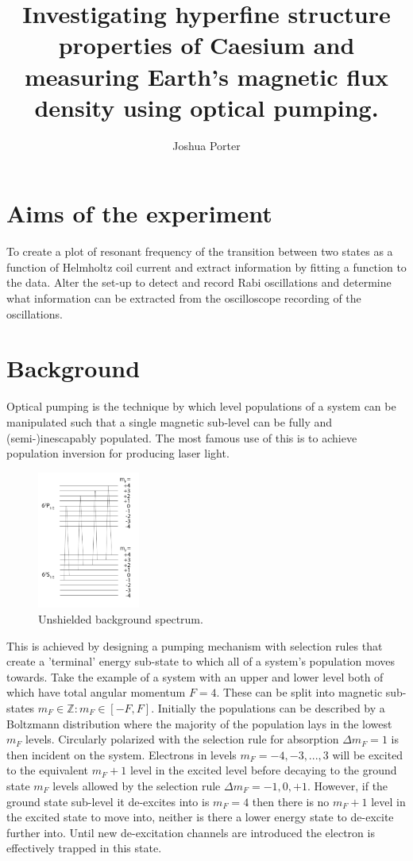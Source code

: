 \documentclass{article}
\title{Investigating hyperfine structure properties of Caesium and measuring Earth's magnetic flux density using optical pumping.} %
\author{Joshua Porter} %
\date{} %
\newcommand{\Z}{\mathbb{Z}}
\begin{document}
\maketitle
{}


\section{Aims of the experiment}
To create a plot of resonant frequency of the transition between two states as a function of Helmholtz coil current and extract information by fitting a function to the data. Alter the set-up to detect and record Rabi oscillations and determine what information can be extracted from the oscilloscope recording of the oscillations.
\section{Background}
Optical pumping is the technique by which level populations of a system can be manipulated such that a single magnetic sub-level can be fully and (semi-)inescapably populated. The most famous use of this is to achieve population inversion for producing laser light.

\begin{figure}
	\includegraphics[width=0.3\textwidth]{figure2}
	\caption{Unshielded background spectrum.}
	\label{}
\end{figure}%

This is achieved by designing a pumping mechanism with selection rules that create a 'terminal' energy sub-state to which all of a system's population moves towards. Take the example of a system with an upper and lower level both of which have total angular momentum $F=4$. These can be split into magnetic sub-states $m_F \in \Z : m_F \in [-F, F]$. Initially the populations can be described by a Boltzmann distribution where the majority of the population lays in the lowest $m_F$ levels. Circularly polarized with the selection rule for absorption $\Delta m_F=1$ is then incident on the system. Electrons in levels $m_F=-4, -3,...,3$ will be excited to the equivalent $m_F+1$ level in the excited level before decaying to the ground state $m_F$ levels allowed by the selection rule $\Delta m_F=-1,0,+1$. However, if the ground state sub-level it de-excites into is $m_F=4$ then there is no $m_F+1$ level in the excited state to move into, neither is there a lower energy state to de-excite further into. Until new de-excitation channels are introduced the electron is effectively trapped in this state.
\end{document}
